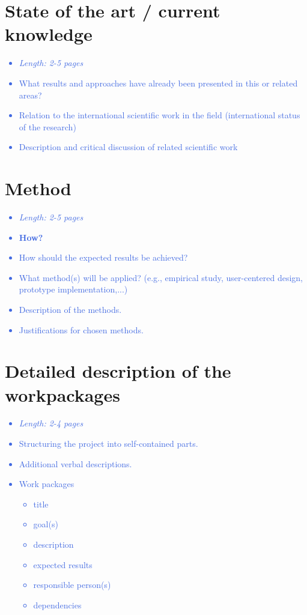 \documentclass[a4paper,11pt]{article}
\providecommand*{\note}[1]{\small \textcolor{RoyalBlue}{\begin{minipage}{\textwidth}{#1}\end{minipage}}}
\begin{document}
\section{State of the art / current knowledge}
\label{sect:star}

\note{
\begin{itemize}
\item {\em Length: 2-5 pages}
\item What results and approaches have already been presented in this or related areas?
\item Relation to the international scientific work in the field (international status of the research)
\item Description and critical discussion of related scientific work
\end{itemize}
}

\section{Method}
\label{sect:method}

\note{
\begin{itemize}
\item {\em Length: 2-5 pages}
\item {\bf How?}
\item How should the expected results be achieved?
\item What method(s) will be applied? (e.g., empirical study, user-centered design, prototype implementation,...)
\item Description of the methods.
\item Justifications for chosen methods.
\end{itemize}
}

\section{Detailed description of the workpackages}
\label{sect:workplan}

\note{
\begin{itemize}
\item {\em Length: 2-4 pages}
\item Structuring the project into self-contained parts.
\item Additional verbal descriptions.
\item Work packages
    \begin{itemize}
    \item title
    \item goal(s)
    \item description
    \item expected results
    \item responsible person(s)
    \item dependencies
    \end{itemize}
\end{itemize}
}
\end{document}
